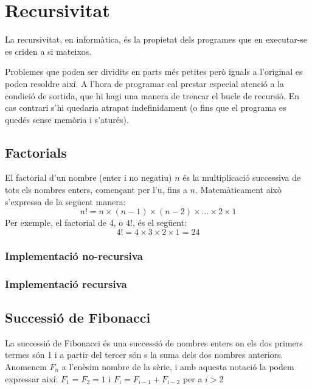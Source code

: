 \chapter{Recursivitat}

La recursivitat, en informàtica, és la propietat dels programes que en executar-se es criden a si mateixos.

Problemes que poden ser dividits en parts més petites però iguals a l'original es poden resoldre així.
A l'hora de programar cal prestar especial atenció a la condició de sortida, que hi hagi una manera de trencar el bucle de recursió. En cas contrari s'hi quedaria atrapat indefinidament (o fins que el programa es quedés sense memòria i s'aturés).

\section{Factorials}
El factorial d'un nombre (enter i no negatiu) $n$ és la multiplicació successiva de tots els nombres enters, començant per l'u, fins a $n$.
Matemàticament això s'expressa de la següent manera:
\begin{equation*}
	n! = n \times (n-1) \times (n-2) \times \ldots \times 2 \times 1 
\end{equation*}
Per exemple, el factorial de 4, o $4!$, és el següent:
\begin{equation*}
	4! = 4 \times 3 \times 2 \times 1 = 24 
\end{equation*}

\subsection{Implementació no-recursiva}

\vspace{1em}

\subsection{Implementació recursiva}

\vspace{1em}

\section{Successió de Fibonacci}
La successió de Fibonacci és una successió de nombres enters on els dos primers termes són 1 i a partir del tercer són s la suma dels dos nombres anteriors.
Anomenem $F_n$ a l'enèsim nombre de la sèrie, i amb aquesta notació la podem expressar així: $F_1=F_2=1$ i $F_i=F_{i-1}+F_{i-2}$ per a $i > 2$

